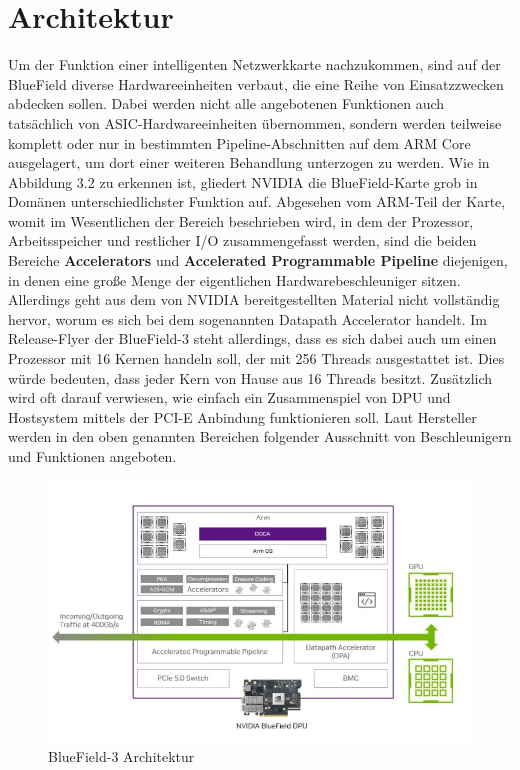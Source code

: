 \section{Architektur}
Um der Funktion einer intelligenten Netzwerkkarte nachzukommen, sind auf der BlueField diverse Hardwareeinheiten verbaut, die eine Reihe von Einsatzzwecken abdecken sollen. Dabei werden nicht alle angebotenen Funktionen auch tatsächlich von ASIC-Hardwareeinheiten übernommen, sondern werden teilweise komplett oder nur in bestimmten Pipeline-Abschnitten auf dem ARM Core ausgelagert, um dort einer weiteren Behandlung unterzogen zu werden. Wie in Abbildung 3.2 zu erkennen ist, gliedert NVIDIA die BlueField-Karte grob in Domänen unterschiedlichster Funktion auf. Abgesehen vom ARM-Teil der Karte, womit im Wesentlichen der Bereich beschrieben wird, in dem der Prozessor, Arbeitsspeicher und restlicher I/O zusammengefasst werden, sind die beiden Bereiche \textbf{Accelerators} und \textbf{Accelerated Programmable Pipeline} diejenigen, in denen eine große Menge der eigentlichen Hardwarebeschleuniger sitzen. Allerdings geht aus dem von NVIDIA bereitgestellten Material nicht vollständig hervor, worum es sich bei dem sogenannten Datapath Accelerator handelt. Im Release-Flyer der BlueField-3 steht allerdings, dass es sich dabei auch um einen Prozessor mit 16 Kernen handeln soll, der mit 256 Threads ausgestattet ist. Dies würde bedeuten, dass jeder Kern von Hause aus 16 Threads besitzt. Zusätzlich wird oft darauf verwiesen, wie einfach ein Zusammenspiel von DPU und Hostsystem mittels der PCI-E Anbindung funktionieren soll. Laut Hersteller werden in den oben genannten Bereichen folgender Ausschnitt von Beschleunigern und Funktionen angeboten. 
\begin{figure}
    \centering
    \includegraphics[width=1\linewidth]{images/nvda-bluefield-dpu.png}
    \caption{BlueField-3 Architektur}
    \label{fig:enter-label}
\end{figure}
